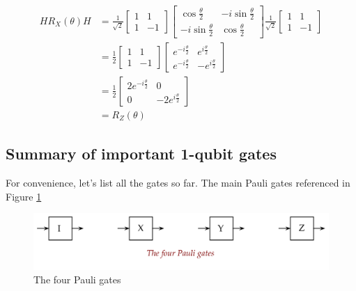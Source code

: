\documentclass[main.tex]{subfiles}
\begin{document}
    $$
    \begin{aligned}
    H R_{X}(\theta) H &=\frac{1}{\sqrt{2}}\left[\begin{array}{cc}
    1 & 1 \\
    1 & -1
    \end{array}\right]\left[\begin{array}{cc}
    \cos \frac{\theta}{2} & -i \sin \frac{\theta}{2} \\
    -i \sin \frac{\theta}{2} & \cos \frac{\theta}{2}
    \end{array}\right] \frac{1}{\sqrt{2}}\left[\begin{array}{cc}
    1 & 1 \\
    1 & -1
    \end{array}\right] \\
    &=\frac{1}{2}\left[\begin{array}{cc}
    1 & 1 \\
    1 & -1
    \end{array}\right]\left[\begin{array}{cc}
    e^{-i \frac{\theta}{2}} & e^{i \frac{\theta}{2}} \\
    e^{-i \frac{\theta}{2}} & -e^{i \frac{\theta}{2}}
    \end{array}\right] \\
    &=\frac{1}{2}\left[\begin{array}{cc}
    2 e^{-i \frac{\theta}{2}} & 0 \\
    0 & -2 e^{i \frac{\theta}{2}}
    \end{array}\right] \\
    &=R_{Z}(\theta)
    \end{aligned}
    $$

\subsection{Summary of important 1-qubit gates}

    For convenience, let's list all the gates so far. The main Pauli gates referenced in Figure \ref{fig:10gate1}
    
    \begin{figure}
        \centering
        \includegraphics[width=5in]{notes/figs/n08/10gate1.png}
        \caption{The four Pauli gates}
        \label{fig:10gate1}
    \end{figure}
    
\end{document}
